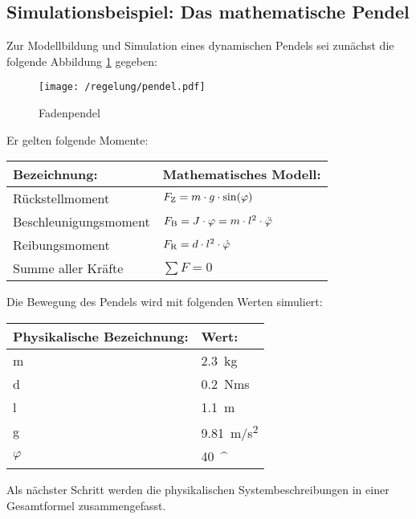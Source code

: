 \subsection{Simulationsbeispiel: Das mathematische Pendel}

Zur Modellbildung und Simulation eines dynamischen Pendels sei zunächst die folgende Abbildung \ref{fig:pendel} gegeben:

\newpage

\begin{figure}[h]
	\centering
	\texttt{[image: /regelung/pendel.pdf]}
	\label{fig:pendel}
	\caption{Fadenpendel}
\end{figure}

Er gelten folgende Momente:

\begin{center}
	\begin{tabular}{ll}
		\toprule
		Bezeichnung:				&	Mathematisches Modell: \\
		\midrule
		Rückstellmoment				&	$F_\i{Z} = m \cdot g \cdot \si{sin}(\varphi) \label{rueckstellmoment}$ \\
		Beschleunigungsmoment		&	$F_\i{B} = J \cdot \varphi = m \cdot l^{2} \cdot \ddot\varphi\label{beschleunigungsmoment} $ \\
		Reibungsmoment				&	$F_\i{R} = d \cdot l^{2} \cdot \dot\varphi\label{reibungsmoment} $ \\
		Summe aller Kräfte			&	$\sum F = 0 \label{momentengleichgewicht} $ \\
		\bottomrule 
	\end{tabular}
\end{center}
		
Die Bewegung des Pendels wird mit folgenden Werten simuliert:

\begin{center}
	\begin{tabular}{ll}
		\toprule
		Physikalische Bezeichnung:	& Wert: \\
		\midrule
		m		& \SI{2,3}{kg} \\
		d		& \SI{0,2}{Nms} \\
		l		& \SI{1,1}{m} \\
		g		& \SI{9,81}{m/s^2}\\
		$\varphi$ & \SI{40}{^\circ}\\
		\bottomrule
	\end{tabular}
\end{center}
	
Als nächster Schritt werden die physikalischen Systembeschreibungen in einer Gesamtformel zusammengefasst. 

